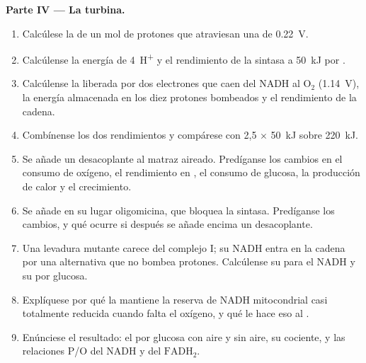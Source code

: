 \begin{problem}
\medskip
\noindent\textbf{Parte IV --- La turbina.}
\begin{enumerate}[resume]
  \item Calcúlese la  de un mol de protones que atraviesan una
         de \qty{0.22}{V}.
  \item Calcúlense la energía de \qty{4}{H^+} y el rendimiento de la
        sintasa a \qty{50}{kJ} por .
  \item Calcúlense la  liberada por dos electrones que caen
        del NADH al $\mathrm{O_2}$ (\qty{1.14}{V}), la energía almacenada
        en los diez protones bombeados y el rendimiento de la cadena.
  \item Combínense los dos rendimientos y compárese con 2,5  $\times$
        \qty{50}{kJ} sobre \qty{220}{kJ}.
  \item Se añade un desacoplante al matraz aireado. Predíganse los cambios
        en el consumo de oxígeno, el rendimiento en , el consumo de
        glucosa, la producción de calor y el crecimiento.
  \item Se añade en su lugar oligomicina, que bloquea la sintasa.
        Predíganse los cambios, y qué ocurre si después se añade encima un
        desacoplante.
  \item Una levadura mutante carece del complejo I; su NADH entra en la
        cadena por una  alternativa que no bombea protones.
        Calcúlense su  para el NADH y su  por glucosa.
  \item Explíquese por qué la  mantiene la reserva de NADH
        mitocondrial casi totalmente reducida cuando falta el oxígeno, y
        qué le hace eso al .
  \item Enúnciese el resultado: el  por glucosa con aire y sin aire, su
        cociente, y las relaciones P/O del NADH y del $\mathrm{FADH_2}$.
\end{enumerate}
\end{problem}
